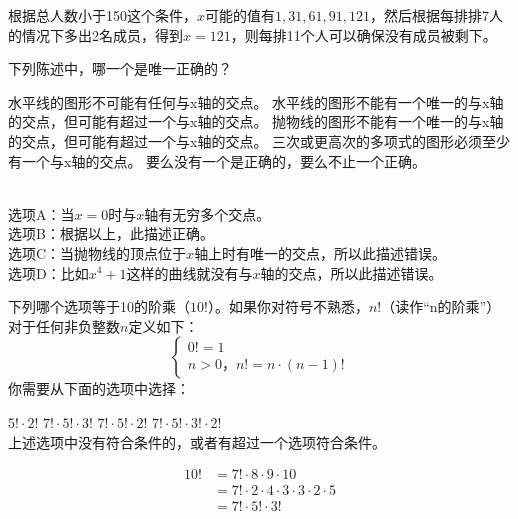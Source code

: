\begin{questions}
\begin{solution}
		根据总人数小于150这个条件，$x$可能的值有$1,31,61,91,121$，然后根据每排排7人的情况下多出2名成员，得到$x=121$，则每排11个人可以确保没有成员被剩下。

	\end{solution}

	\question 下列陈述中，哪一个是唯一正确的？
	\begin{choices}
		\choice 水平线的图形不可能有任何与x轴的交点。
		\CorrectChoice 水平线的图形不能有一个唯一的与x轴的交点，但可能有超过一个与x轴的交点。
		\choice 抛物线的图形不能有一个唯一的与x轴的交点，但可能有超过一个与x轴的交点。
		\choice 三次或更高次的多项式的图形必须至少有一个与x轴的交点。
		\choice 要么没有一个是正确的，要么不止一个正确。
	\end{choices}
	\begin{solution}\\
		选项A：当$x=0$时与$x$轴有无穷多个交点。\\
		选项B：根据以上，此描述正确。\\
		选项C：当抛物线的顶点位于$x$轴上时有唯一的交点，所以此描述错误。\\
		选项D：比如$x^4+1$这样的曲线就没有与$x$轴的交点，所以此描述错误。
	\end{solution}

	\question 下列哪个选项等于10的阶乘（$10!$）。如果你对符号不熟悉，$n!$（读作\enquote{n的阶乘}）对于任何非负整数$n$定义如下：
	\begin{equation*}
		\begin{cases}
			0! = 1 \\
			n > 0，n! = n \cdot (n-1)!
		\end{cases}
	\end{equation*}
	你需要从下面的选项中选择：

	\begin{oneparchoices}
		\choice $5! \cdot 2!$
		\CorrectChoice $7! \cdot 5! \cdot 3!$
		\choice $7! \cdot 5! \cdot 2!$
		\choice $7! \cdot 5! \cdot 3! \cdot 2!$ \\
		\choice 上述选项中没有符合条件的，或者有超过一个选项符合条件。
	\end{oneparchoices}

	\begin{solution}
		\begin{align*}
			10! & = 7! \cdot 8 \cdot 9 \cdot 10                        \\
			    & = 7! \cdot 2 \cdot 4 \cdot 3 \cdot 3 \cdot 2 \cdot 5 \\
			    & = 7! \cdot 5! \cdot 3!
		\end{align*}
	\end{solution}


\end{questions}
